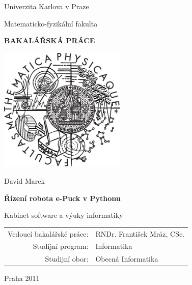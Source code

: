 

\pagestyle{empty}
\begin{center}

\large

Univerzita Karlova v Praze

\medskip

Matematicko-fyzikální fakulta

\vfill

{\bf\Large BAKALÁŘSKÁ PRÁCE}

\vfill

\centerline{\mbox{\includegraphics[width=60mm]{img/logo.eps}}}

\vfill
\vspace{5mm}

{\LARGE David Marek}

\vspace{15mm}

{\LARGE\bfseries Řízení robota e-Puck v Pythonu}

\vfill

Kabinet software a výuky informatiky

\vfill

\begin{tabular}{rl}

Vedoucí bakalářské práce: & RNDr. František Mráz, CSc.\\
\noalign{\vspace{2mm}}
Studijní program: & Informatika \\
\noalign{\vspace{2mm}}
Studijní obor: & Obecná Informatika \\
\end{tabular}

\vfill

Praha 2011

\end{center}

